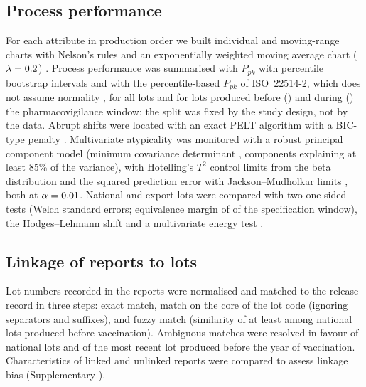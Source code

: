 \documentclass[11pt]{article}
\begin{document}
\subsection{Process performance}\label{sec:m-spc}
For each attribute in production order we built individual and moving-range charts with Nelson's
rules \cite{Nelson1984,Montgomery2019} and an exponentially weighted moving average chart
($\lambda=\num{0.2}$) \cite{Lucas1990}. Process performance was summarised with $P_{pk}$
with \PTCapBootstrap{} percentile bootstrap intervals \cite{Efron1987} and with the
percentile-based $P_{pk}$ of ISO~22514-2, which does not assume normality \cite{ISO22514-2}, for
all lots and for lots produced before (\PTPeriodOne) and during (\PTPeriodTwo) the
pharmacovigilance window; the split was fixed by the study design, not by the data. Abrupt shifts
were located with an exact PELT algorithm with a BIC-type penalty \cite{Killick2012,Truong2020}.
Multivariate atypicality was monitored with a robust principal component model (minimum covariance
determinant \cite{Rousseeuw1999}, components explaining at least 85\% of the variance), with
Hotelling's $T^2$ control limits from the beta distribution \cite{Tracy1992} and the squared
prediction error with Jackson--Mudholkar limits \cite{Jackson1979,MacGregor1995}, both at
$\alpha=\num{0.01}$. National and export lots were compared with two one-sided tests
\cite{Schuirmann1987} (Welch standard errors; equivalence margin of \PTEqMarginPct{} of the
specification window), the Hodges--Lehmann shift \cite{Hodges1963} and a multivariate energy test
\cite{Szekely2013}.

\subsection{Linkage of reports to lots}\label{sec:m-link}
Lot numbers recorded in the reports were normalised and matched to the release record in three
steps: exact match, match on the core of the lot code (ignoring separators and suffixes), and
fuzzy match (similarity of at least \PTFuzzyThreshold{} among national lots produced before
vaccination). Ambiguous matches were resolved in favour of national lots and of the most recent
lot produced before the year of vaccination. Characteristics of linked and unlinked reports were
compared to assess linkage bias (Supplementary ).
\end{document}
